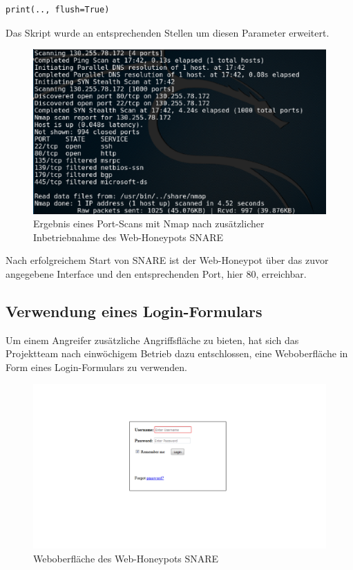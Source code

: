 \begin{lstlisting}[style=customc]
print(.., flush=True)
\end{lstlisting}

Das Skript wurde an entsprechenden Stellen um diesen Parameter erweitert.

\begin{figure}[ht]
	\centering
		\includegraphics[width=1.0\textwidth]{img/nmap_web.png}
	\caption{Ergebnis eines Port-Scans mit Nmap nach zusätzlicher Inbetriebnahme des Web-Honeypots SNARE}
	\label{fig:nmap_web}
\end{figure}

Nach erfolgreichem Start von SNARE ist der Web-Honeypot über das zuvor angegebene Interface und den entsprechenden Port, hier 80, erreichbar.

\subsection{Verwendung eines Login-Formulars}
\label{subsec:Installation und Konfiguration SNARE}

Um einem Angreifer zusätzliche Angriffsfläche zu bieten, hat sich das Projektteam nach einwöchigem Betrieb dazu entschlossen, eine Weboberfläche in Form eines Login-Formulars zu verwenden. 

\begin{figure}[ht]
	\centering
		\includegraphics[width=1.0\textwidth]{img/snare_login.png}
	\caption{Weboberfläche des Web-Honeypots SNARE}
	\label{fig:snare_login}
\end{figure}

